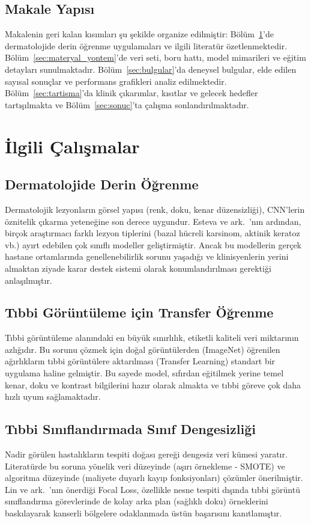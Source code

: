 \documentclass[12pt,a4paper]{article}
\begin{document}
\subsection{Makale Yapısı}
\label{subsec:makale_yapisi}

Makalenin geri kalan kısımları şu şekilde organize edilmiştir: Bölüm~\ref{sec:ilgili_calismalar}'de dermatolojide derin öğrenme uygulamaları ve ilgili literatür özetlenmektedir. Bölüm~\ref{sec:materyal_yontem}'de veri seti, boru hattı, model mimarileri ve eğitim detayları sunulmaktadır. Bölüm~\ref{sec:bulgular}'da deneysel bulgular, elde edilen sayısal sonuçlar ve performans grafikleri analiz edilmektedir. Bölüm~\ref{sec:tartisma}'da klinik çıkarımlar, kısıtlar ve gelecek hedefler tartışılmakta ve Bölüm~\ref{sec:sonuc}'ta çalışma sonlandırılmaktadır.

\section{İlgili Çalışmalar}
\label{sec:ilgili_calismalar}

\subsection{Dermatolojide Derin Öğrenme}
Dermatolojik lezyonların görsel yapısı (renk, doku, kenar düzensizliği), CNN'lerin öznitelik çıkarma yeteneğine son derece uygundur. Esteva ve ark.~\cite{esteva2017}'nın ardından, birçok araştırmacı farklı lezyon tiplerini (bazal hücreli karsinom, aktinik keratoz vb.) ayırt edebilen çok sınıflı modeller geliştirmiştir. Ancak bu modellerin gerçek hastane ortamlarında genellenebilirlik sorunu yaşadığı ve klinisyenlerin yerini almaktan ziyade karar destek sistemi olarak konumlandırılması gerektiği anlaşılmıştır.

\subsection{Tıbbi Görüntüleme için Transfer Öğrenme}
Tıbbi görüntüleme alanındaki en büyük sınırlılık, etiketli kaliteli veri miktarının azlığıdır. Bu sorunu çözmek için doğal görüntülerden (ImageNet) öğrenilen ağırlıkların tıbbi görüntülere aktarılması (Transfer Learning) standart bir uygulama haline gelmiştir. Bu sayede model, sıfırdan eğitilmek yerine temel kenar, doku ve kontrast bilgilerini hazır olarak almakta ve tıbbi göreve çok daha hızlı uyum sağlamaktadır.

\subsection{Tıbbi Sınıflandırmada Sınıf Dengesizliği}
Nadir görülen hastalıkların tespiti doğası gereği dengesiz veri kümesi yaratır. Literatürde bu soruna yönelik veri düzeyinde (aşırı örnekleme - SMOTE) ve algoritma düzeyinde (maliyete duyarlı kayıp fonksiyonları) çözümler önerilmiştir. Lin ve ark.~\cite{lin2017}'nın önerdiği Focal Loss, özellikle nesne tespiti dışında tıbbi görüntü sınıflandırma görevlerinde de kolay arka plan (sağlıklı doku) örneklerini baskılayarak kanserli bölgelere odaklanmada üstün başarısını kanıtlamıştır.
\end{document}
